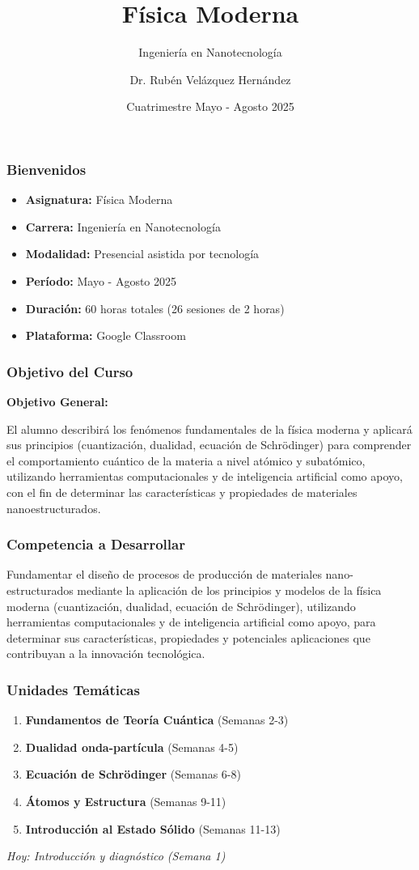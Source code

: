 \documentclass{beamer}
\title[Física Moderna]{Física Moderna}
\subtitle{Ingeniería en Nanotecnología}
\author{Dr. Rubén Velázquez Hernández}
\institute[UTEQ]{Universidad Tecnológica de Querétaro}
\date{Cuatrimestre Mayo - Agosto 2025}
\begin{document}
\frame{\titlepage}

\begin{frame}
    \frametitle{Bienvenidos}
    \begin{itemize}
        \item \textbf{Asignatura:} Física Moderna
        \item \textbf{Carrera:} Ingeniería en Nanotecnología
        \item \textbf{Modalidad:} Presencial asistida por tecnología
        \item \textbf{Período:} Mayo - Agosto 2025
        \item \textbf{Duración:} 60 horas totales (26 sesiones de 2 horas)
        \item \textbf{Plataforma:} Google Classroom
    \end{itemize}
\end{frame}

\begin{frame}
    \frametitle{Objetivo del Curso}
    \textbf{Objetivo General:}
    \vspace{0.5cm}
    
    El alumno describirá los fenómenos fundamentales de la física moderna y aplicará sus principios (cuantización, dualidad, ecuación de Schrödinger) para comprender el comportamiento cuántico de la materia a nivel atómico y subatómico, utilizando herramientas computacionales y de inteligencia artificial como apoyo, con el fin de determinar las características y propiedades de materiales nanoestructurados.
\end{frame}

\begin{frame}
    \frametitle{Competencia a Desarrollar}
    
    Fundamentar el diseño de procesos de producción de materiales nano-estructurados mediante la aplicación de los principios y modelos de la física moderna (cuantización, dualidad, ecuación de Schrödinger), utilizando herramientas computacionales y de inteligencia artificial como apoyo, para determinar sus características, propiedades y potenciales aplicaciones que contribuyan a la innovación tecnológica.
\end{frame}

\begin{frame}
    \frametitle{Unidades Temáticas}
    \begin{enumerate}
        \item \textbf{Fundamentos de Teoría Cuántica} (Semanas 2-3)
        \item \textbf{Dualidad onda-partícula} (Semanas 4-5)
        \item \textbf{Ecuación de Schrödinger} (Semanas 6-8)
        \item \textbf{Átomos y Estructura} (Semanas 9-11)
        \item \textbf{Introducción al Estado Sólido} (Semanas 11-13)
    \end{enumerate}
    \vspace{0.5cm}
    \textit{Hoy: Introducción y diagnóstico (Semana 1)}
\end{frame}
\end{document}
